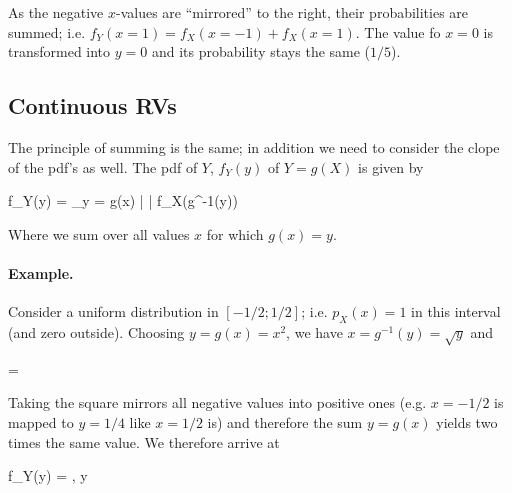 As the negative $x$-values are ``mirrored'' to the right, their probabilities are summed; i.e. $f_Y(x=1) = f_X(x=-1) + f_X(x=1)$. The value fo $x=0$ is transformed into $y=0$ and its probability stays the same ($1/5$).

\subsection{Continuous RVs}

The principle of summing is the same; in addition we need to consider the clope of the pdf's as well. The pdf of $Y$, $f_Y(y)$ of $Y = g(X)$ is given by

\bee
f_Y(y) = \sum_{y = g(x)} \left|  \right| f_X(g^{-1}(y))
\eee

Where we sum over all values $x$ for which $g(x) = y$.

\paragraph{Example.} Consider a uniform distribution in $[-1/2;1/2]$; i.e. $p_X(x) = 1$ in this interval (and zero outside). Choosing $y=g(x) = x^2$, we have $x = g^{-1}(y) = \sqrt{y}$ and

\bee
{} = \pm {}
\eee

Taking the square mirrors all negative values into positive ones (e.g. $x=-1/2$ is mapped to $y=1/4$ like $x=1/2$ is) and therefore the sum $y=g(x)$ yields two times the same value. We therefore arrive at

\bee
f_Y(y) = , \quad y \in [0;1/4]
\eee




